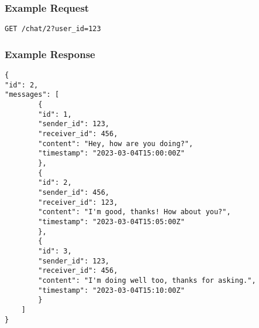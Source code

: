 \documentclass{article}
\begin{document}
\subsubsection{Example Request}

\begin{verbatim}
GET /chat/2?user_id=123
\end{verbatim}

\subsubsection{Example Response}

\begin{verbatim}
{
"id": 2,
"messages": [
        {
        "id": 1,
        "sender_id": 123,
        "receiver_id": 456,
        "content": "Hey, how are you doing?",
        "timestamp": "2023-03-04T15:00:00Z"
        },
        {
        "id": 2,
        "sender_id": 456,
        "receiver_id": 123,
        "content": "I'm good, thanks! How about you?",
        "timestamp": "2023-03-04T15:05:00Z"
        },
        {
        "id": 3,
        "sender_id": 123,
        "receiver_id": 456,
        "content": "I'm doing well too, thanks for asking.",
        "timestamp": "2023-03-04T15:10:00Z"
        }
    ]
}
\end{verbatim}
\end{document}

